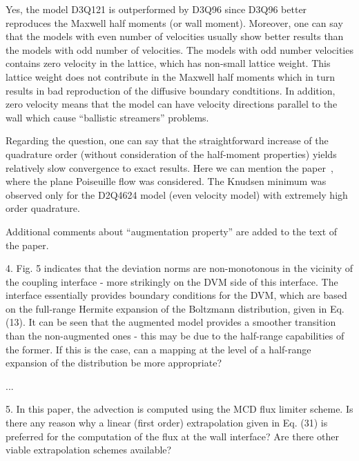 \documentclass{article}
\begin{document}
Yes, the model D3Q121 is outperformed by D3Q96
since D3Q96 better reproduces the Maxwell half moments (or wall moment).
Moreover, one can say that the models with even number of velocities usually show better results
than the models with odd number of velocities.
The models with odd number velocities contains zero velocity in the lattice,
which has non-small lattice weight.
This lattice weight does not contribute in the Maxwell half moments
which in turn results in bad reproduction of the diffusive boundary condtitions.
In addition, zero velocity means that the model can have velocity directions parallel to the wall
which cause ``ballistic streamers'' problems.

Regarding the question, one can say that the straightforward increase of the quadrature order
(without consideration of the half-moment properties)
yields relatively slow convergence to exact results.
Here we can mention the paper~\cite{Meng2011accuracy},
where the plane Poiseuille flow was considered.
The Knudsen minimum was observed only for the D2Q4624 model (even velocity model)
with extremely high order quadrature.

Additional comments about ``augmentation property'' are added to the text of the paper.

\begin{leftbar}
\end{leftbar}

\begin{quoting}
    4. Fig. 5 indicates that the deviation norms are
    non-monotonous in the vicinity of the coupling
    interface - more strikingly on the DVM side of this
    interface. The interface essentially provides boundary
    conditions for the DVM, which are based on the
    full-range Hermite expansion of the Boltzmann
    distribution, given in Eq. (13). It can be seen that
    the augmented model provides a smoother transition than
    the non-augmented ones - this may be due to the
    half-range capabilities of the former. If this is
    the case, can a mapping at the level of a half-range
    expansion of the distribution be more appropriate?
\end{quoting}

...

\begin{leftbar}
\end{leftbar}

\begin{quoting}
    5. In this paper, the advection is computed using
    the MCD flux limiter scheme. Is there any reason why
    a linear (first order) extrapolation given in
    Eq. (31) is preferred for the computation of the
    flux at the wall interface? Are there other viable
    extrapolation schemes available?
\end{quoting}
\end{document}

